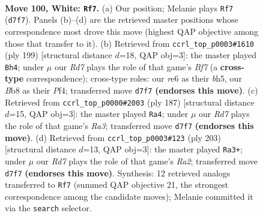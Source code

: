 \documentclass[11pt]{article}
\begin{document}
\clearpage

\begin{figure}[p]\centering
\begin{subfigure}{0.46\textwidth}\centering
\resizebox{\linewidth}{!}{%
\newchessgame
\chessboard[
  setfen={1B5k/3R4/4r3/7P/4p3/5p2/3K1P2/8 w - - 7 100},
  showmover=false,
  pgfstyle=straightmove, color=movearrow, markmove={d7-f7}
]}
\caption{}
\end{subfigure}\hfill
\begin{subfigure}{0.46\textwidth}\centering
\resizebox{\linewidth}{!}{%
\newchessgame
\chessboard[
  setfen={8/8/1k1p4/3P3B/1P3p2/2PK4/5b2/8 b - - 6 100},
  showmover=false,
  pgfstyle=straightmove, color=movearrow, markmove={f2-h4}
]}
\caption{}
\end{subfigure}
\\[4pt]
\begin{subfigure}{0.46\textwidth}\centering
\resizebox{\linewidth}{!}{%
\newchessgame
\chessboard[
  setfen={8/8/r4k2/5p2/5P2/2R1P3/8/4K3 b - - 66 94},
  showmover=false,
  pgfstyle=straightmove, color=movearrow, markmove={a6-a4}
]}
\caption{}
\end{subfigure}\hfill
\begin{subfigure}{0.46\textwidth}\centering
\resizebox{\linewidth}{!}{%
\newchessgame
\chessboard[
  setfen={8/r5k1/8/6Pp/3R3P/6K1/8/8 b - - 10 102},
  showmover=false,
  pgfstyle=straightmove, color=movearrow, markmove={a7-a3}
]}
\caption{}
\end{subfigure}
\caption{\textbf{Move 100, White: \texttt{Rf7}.} (a) Our position; Melanie plays \texttt{Rf7} (\texttt{d7f7}). Panels (b)--(d) are the retrieved master positions whose correspondence most drove this move (highest QAP objective among those that transfer to it). (b) Retrieved from \texttt{ccrl\_top\_p0003\#1610} (ply 199) [structural distance $d$=18, QAP obj=3]: the master played \texttt{Bh4}; under $\mu$ our \emph{Rd7} plays the role of that game's \emph{Bf7} (a \textbf{cross-type} correspondence); cross-type roles: our \emph{r}e6 as their \emph{b}h5, our \emph{B}b8 as their \emph{P}f4; transferred move \texttt{d7f7} \textbf{(endorses this move)}. (c) Retrieved from \texttt{ccrl\_top\_p0000\#2003} (ply 187) [structural distance $d$=15, QAP obj=3]: the master played \texttt{Ra4}; under $\mu$ our \emph{Rd7} plays the role of that game's \emph{Ra3}; transferred move \texttt{d7f7} \textbf{(endorses this move)}. (d) Retrieved from \texttt{ccrl\_top\_p0003\#123} (ply 203) [structural distance $d$=13, QAP obj=3]: the master played \texttt{Ra3+}; under $\mu$ our \emph{Rd7} plays the role of that game's \emph{Ra2}; transferred move \texttt{d7f7} \textbf{(endorses this move)}. Synthesis: 12 retrieved analogs transferred to \texttt{Rf7} (summed QAP objective 21, the strongest correspondence among the candidate moves); Melanie committed it via the \texttt{search} selector.}
\label{fig:thought-m198}
\end{figure}
\end{document}
